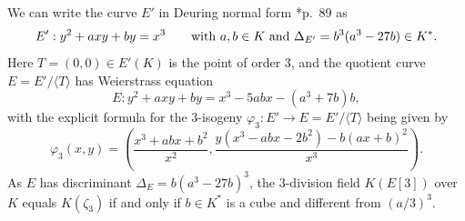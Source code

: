 \documentclass{amsart}
\theoremstyle{plain}
\theoremstyle{definition}
\begin{document}
We can write the curve $E'$ in Deuring normal form \cite{Husemoller}*{p.\ 89} as
\begin{equation}
\label{Deuringnf-ab}
E': y^2+axy+by=x^3 \qquad \hbox{with } 
    a,b \in K \hbox{ and } \Delta_{E'}=b^3(a^3-27b)\in K^*.
\end{equation}
Here $T=(0,0)\in E'(K)$ is the point of order 3, and
the quotient curve $E=E'/\langle T\rangle$ has 
Weierstrass equation 
\begin{equation}
\label{3-isogcurve-ab}
E: y^2+axy+by=x^3-5abx-(a^3+7b)b,
\end{equation}
with the explicit formula for the 3-isogeny 
$\varphi_3: E'\to E=E'/\langle T\rangle$  being given by 
\begin{equation}
\label{explicit3isog}
\varphi_3(x,y)= \left(
\frac{x^3+abx+b^2}{x^2},
    \frac{y(x^3-abx-2b^2)-b(ax+b)^2}{x^3}\right).
\end{equation}
As $E$ has discriminant $\Delta_E=b(a^3-27b)^3$, the 
3-division field $K(E[3])$ over $K$ equals $K(\zeta_3)$  
if and only if $b\in K^*$ is a cube and different from $(a/3)^3$.
\end{document}
